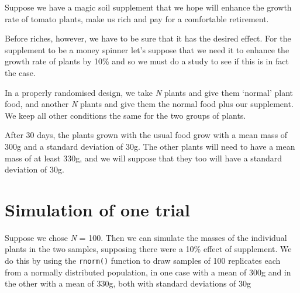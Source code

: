 \documentclass[
  letterpaper,
  DIV=11,
  numbers=noendperiod]{scrreprt}
\begin{document}
Suppose we have a magic soil supplement that we hope will enhance the
growth rate of tomato plants, make us rich and pay for a comfortable
retirement.

Before riches, however, we have to be sure that it has the desired
effect. For the supplement to be a money spinner let's suppose that we
need it to enhance the growth rate of plants by 10\% and so we must do a
study to see if this is in fact the case.

In a properly randomised design, we take \emph{N} plants and give them
`normal' plant food, and another \emph{N} plants and give them the
normal food plus our supplement. We keep all other conditions the same
for the two groups of plants.

After 30 days, the plants grown with the usual food grow with a mean
mass of 300g and a standard deviation of 30g. The other plants will need
to have a mean mass of at least 330g, and we will suppose that they too
will have a standard deviation of 30g.

\section{Simulation of one trial}\label{simulation-of-one-trial}

Suppose we chose \emph{N} = 100. Then we can simulate the masses of the
individual plants in the two samples, supposing there were a 10\% effect
of supplement. We do this by using the \texttt{rnorm()} function to draw
samples of 100 replicates each from a normally distributed population,
in one case with a mean of 300g and in the other with a mean of 330g,
both with standard deviations of 30g
\end{document}
